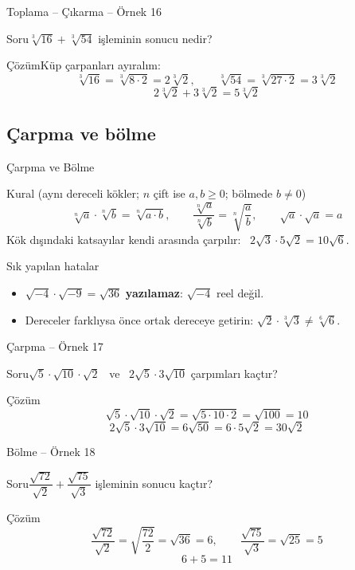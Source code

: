 \documentclass[aspectratio=169,11pt]{beamer}
\newcommand{\soru}[3]{%
\begin{frame}{#1}
  \begin{block}{Soru}\large #2\end{block}
  \pause
  \begin{exampleblock}{Çözüm}\large #3\end{exampleblock}
\end{frame}}
\begin{document}
\soru{Toplama -- Çıkarma -- Örnek 16}
{\(\sqrt[3]{16}+\sqrt[3]{54}\) işleminin sonucu nedir?}
{Küp çarpanları ayıralım:
\[\sqrt[3]{16}=\sqrt[3]{8\cdot 2}=2\sqrt[3]{2},\qquad \sqrt[3]{54}=\sqrt[3]{27\cdot 2}=3\sqrt[3]{2}\]
\[2\sqrt[3]{2}+3\sqrt[3]{2}=5\sqrt[3]{2}\]}

\subsection{Çarpma ve bölme}
\begin{frame}{Çarpma ve Bölme}
\begin{block}{Kural (aynı dereceli kökler; \(n\) çift ise \(a,b\ge 0\); bölmede \(b\neq 0\))}
\[\sqrt[n]{a}\cdot\sqrt[n]{b}=\sqrt[n]{a\cdot b},\qquad \frac{\sqrt[n]{a}}{\sqrt[n]{b}}=\sqrt[n]{\frac{a}{b}},\qquad \sqrt{a}\cdot\sqrt{a}=a\]
Kök dışındaki katsayılar kendi arasında çarpılır: \ \(2\sqrt3\cdot 5\sqrt2=10\sqrt6\).
\end{block}
\begin{alertblock}{Sık yapılan hatalar}
\begin{itemize}
\item \(\sqrt{-4}\cdot\sqrt{-9}=\sqrt{36}\) \textbf{yazılamaz}: \(\sqrt{-4}\) reel değil.
\item Dereceler farklıysa önce ortak dereceye getirin: \(\sqrt2\cdot\sqrt[3]{3}\neq\sqrt[6]{6}\).
\end{itemize}
\end{alertblock}
\end{frame}

\soru{Çarpma -- Örnek 17}
{\(\sqrt5\cdot\sqrt{10}\cdot\sqrt2\) \ ve \ \(2\sqrt5\cdot 3\sqrt{10}\) çarpımları kaçtır?}
{\[\sqrt5\cdot\sqrt{10}\cdot\sqrt2=\sqrt{5\cdot 10\cdot 2}=\sqrt{100}=10\]
\[2\sqrt5\cdot 3\sqrt{10}=6\sqrt{50}=6\cdot 5\sqrt2=30\sqrt2\]}

\soru{Bölme -- Örnek 18}
{\(\dfrac{\sqrt{72}}{\sqrt2}+\dfrac{\sqrt{75}}{\sqrt3}\) işleminin sonucu kaçtır?}
{\[\frac{\sqrt{72}}{\sqrt2}=\sqrt{\frac{72}{2}}=\sqrt{36}=6,\qquad \frac{\sqrt{75}}{\sqrt3}=\sqrt{25}=5\]
\[6+5=11\]}
\end{document}
